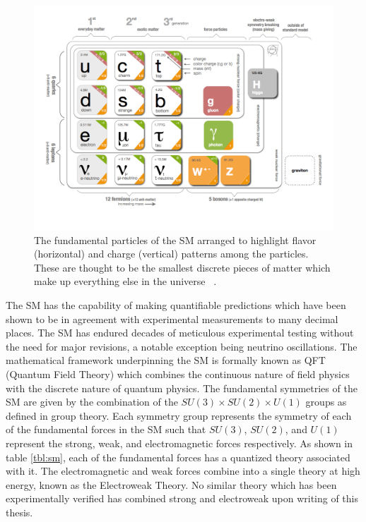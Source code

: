 \begin{figure}[!ht]
\begin{center}
\includegraphics[width=0.65\linewidth]{figs/standard_model_chart.png}
\caption{The fundamental particles of the SM arranged to highlight flavor (horizontal) and charge (vertical) patterns among the particles. These are thought to be the smallest discrete pieces of matter which make up everything else in the universe ~\cite{PhysRevD.86.010001}.}
\end{center}
\label{fig:stnd_mdl_chart}
\end{figure}

The SM has the capability of making quantifiable predictions which have been shown to be in agreement with experimental measurements to many decimal places. The SM has endured decades of meticulous experimental testing without the need for major revisions, a notable exception being neutrino oscillations. The mathematical framework underpinning the SM is formally known as QFT (Quantum Field Theory) which combines the continuous nature of field physics with the discrete nature of quantum physics. 
The fundamental symmetries of the SM are given by the combination of the $SU(3)\times SU(2)\times U(1)$ groups as defined in group theory. Each symmetry group represents the symmetry of each of the fundamental forces in the SM such that $SU(3)$, $SU(2)$, and $U(1)$ represent the strong, weak, and electromagnetic forces respectively. As shown in table \ref{tbl:sm}, each of the fundamental forces has a quantized theory associated with it. The electromagnetic and weak forces combine into a single theory at high energy, known as the Electroweak Theory. No similar theory which has been experimentally verified has combined strong and electroweak upon writing of this thesis.

